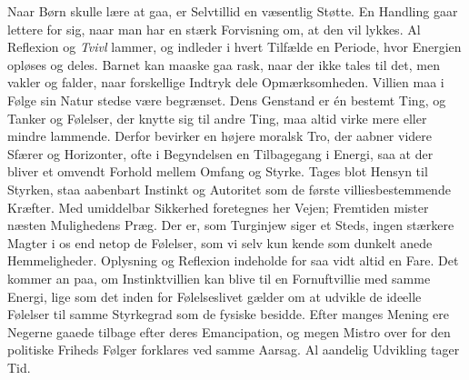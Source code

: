 \documentclass[12pt,a4paper,openany]{book}
\begin{document}
Naar Børn skulle lære at gaa, er Selvtillid en væsentlig Støtte. En
Handling gaar lettere for sig, naar man har en stærk Forvisning om, at
den vil lykkes. Al Reflexion og \emph{Tvivl} lammer, og indleder i hvert
Tilfælde en Periode, hvor Energien opløses og deles. Barnet kan maaske
gaa rask, naar der ikke tales til det, men vakler og falder, naar
forskellige Indtryk dele Opmærksomheden. Villien maa i Følge sin Natur
stedse være begrænset. Dens Genstand er én bestemt Ting, og Tanker og
Følelser, der knytte sig til andre Ting, maa altid virke mere eller
mindre lammende. Derfor bevirker en højere moralsk Tro, der aabner
videre Sfærer og Horizonter, ofte i Begyndelsen en Tilbagegang i Energi,
saa at der bliver et omvendt Forhold mellem Omfang og Styrke. Tages blot
Hensyn til Styrken, staa aabenbart Instinkt og Autoritet som de første
villiesbestemmende Kræfter. Med umiddelbar Sikkerhed foretegnes her
Vejen; Fremtiden mister næsten Mulighedens Præg. Der er, som Turginjew
siger et Steds, ingen stærkere Magter i os end netop de Følelser, som vi
selv kun kende som dunkelt anede Hemmeligheder. Oplysning og Reflexion
indeholde for saa vidt altid en Fare. Det kommer an paa, om
Instinktvillien kan blive til en Fornuftvillie med samme Energi, lige
som det inden for Følelseslivet gælder om at udvikle de ideelle Følelser
til samme Styrkegrad som de fysiske besidde. Efter manges Mening ere
Negerne gaaede tilbage efter deres Emancipation, og megen Mistro over
for den politiske Friheds Følger forklares ved samme Aarsag. Al aandelig
Udvikling tager Tid.
\end{document}
